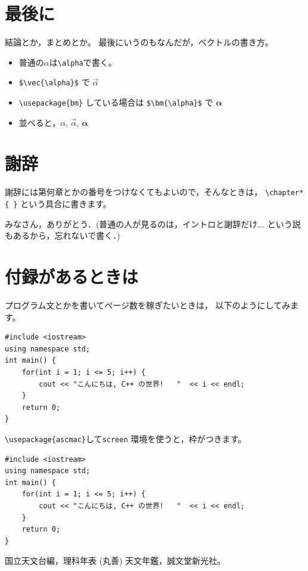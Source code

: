 \documentclass[a4paper,12pt]{jsreport}
\theoremstyle{definition}
\begin{document}
\chapter{最後に}

結論とか，まとめとか。
最後にいうのもなんだが，ベクトルの書き方。
\begin{itemize}
  \item 普通の$\alpha$は\verb|\alpha|で書く。
  \item \verb|$\vec{\alpha}$| で $\vec{\alpha}$
  \item \verb|\usepackage{bm}| している場合は
        \verb|$\bm{\alpha}$| で $\bm{\alpha}$
  \item 並べると，$\alpha$, $\vec{\alpha}$, $\bm{\alpha}$
\end{itemize}


\chapter*{謝辞}

謝辞には第何章とかの番号をつけなくてもよいので，そんなときは，
\verb|\chapter*{ }| という具合に書きます。

みなさん，ありがとう．(普通の人が見るのは，イントロと謝辞だけ... 
という説もあるから，忘れないで書く．)

\appendix
\chapter{付録があるときは}
プログラム文とかを書いてページ数を稼ぎたいときは，
以下のようにしてみます。

\begin{verbatim}
#include <iostream>
using namespace std;
int main() {  
    for(int i = 1; i <= 5; i++) {
        cout << "こんにちは, C++ の世界!   "  << i << endl;
    }
    return 0;
}
\end{verbatim}
\verb|\usepackage{ascmac}|して\verb|screen| 環境を使うと，枠がつきます。
\begin{screen}
\begin{verbatim}
#include <iostream>
using namespace std;
int main() {  
    for(int i = 1; i <= 5; i++) {
        cout << "こんにちは, C++ の世界!   "  << i << endl;
    }
    return 0;
}
\end{verbatim}
\end{screen}

\begin{thebibliography}{99}
 国立天文台編，理科年表 (丸善)
 天文年鑑，誠文堂新光社。
\end{thebibliography}
\end{document}
